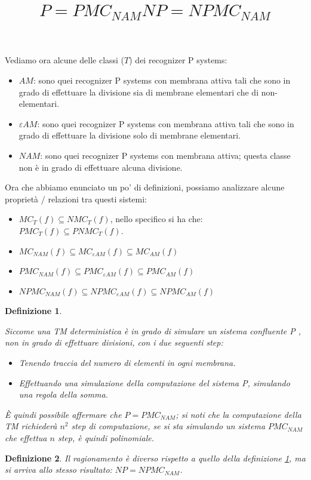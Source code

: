 \documentclass[12pt,a4paper]{report}
\newtheorem{definizione}{Definizione}[section]
\begin{document}
Vediamo ora alcune delle classi ($T$) dei recognizer P systems:
\begin{itemize}
\item $AM$: sono quei recognizer P systems con membrana attiva tali che sono in grado di effettuare la divisione sia di membrane elementari che di non-elementari.
\item $\varepsilon AM$: sono quei recognizer P systems con membrana attiva tali che sono in grado di effettuare la divisione solo di membrane elementari.
\item $N AM$: sono quei recognizer P systems con membrana attiva; questa classe non è in grado di effettuare alcuna divisione.
\end{itemize}

Ora che abbiamo enunciato un po' di definizioni, possiamo analizzare alcune proprietà / relazioni tra questi sistemi:
\begin{itemize}
\item $ MC_{T}(f) \subseteq NMC_{T}(f) $, nello specifico si ha che: $ PMC_{T}(f) \subseteq PNMC_{T}(f) $.
\item $ MC_{N AM}(f) \subseteq MC_{\varepsilon AM}(f) \subseteq MC_{AM}(f) $
\item $ PMC_{N AM}(f) \subseteq PMC_{\varepsilon AM}(f) \subseteq PMC_{AM}(f) $
\item $ NPMC_{N AM}(f) \subseteq NPMC_{\varepsilon AM}(f) \subseteq NPMC_{AM}(f) $
\end{itemize}

\begin{definizione}
\title{$P = PMC_{N AM}$}
\label{P = PNC}

Siccome una TM deterministica è in grado di simulare un sistema confluente P , non in grado di effettuare divisioni, con i due seguenti step:
\begin{itemize}
\item Tenendo traccia del numero di elementi in ogni membrana.
\item Effettuando una simulazione della computazione del sistema P, simulando una regola della somma.
\end{itemize}

È quindi possibile affermare che $P = PMC_{N AM}$; si noti che la computazione della TM richiederà $n^{2}$ step di computazione, se si sta simulando un sistema $PMC_{N AM}$ che effettua $n$ step, è quindi polinomiale.
\end{definizione}

\begin{definizione}
\title{$NP = NPMC_{N AM}$}

Il ragionamento è diverso rispetto a quello della definizione \ref{P = PNC}, ma si arriva allo stesso risultato: $NP = NPMC_{N AM}$.
\end{definizione}
\end{document}
